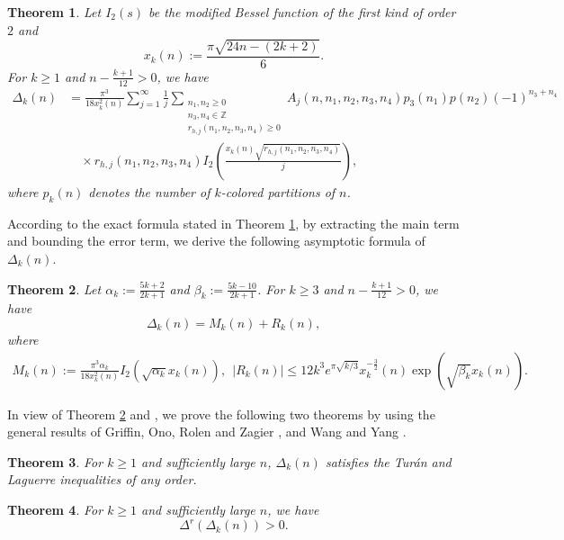 \documentclass[12pt]{article}
\newtheorem{thm}{Theorem}[section]
\numberwithin{equation}{section}
\begin{document}
\begin{thm}\label{exact}
Let $I_{2}(s)$ be the modified Bessel function of the first kind of order $2$ and \begin{equation}\label{defi-xk}
x_{k}(n):=\frac{\pi\sqrt{24n-(2k+2)}}{6}.
\end{equation}
For $k\geq 1$ and $n-\frac{k+1}{12}>0$, we have
\begin{align*}
\Delta_{k}(n)&=\frac{ \pi^3}{18 x^2_{k}(n)}\sum_{j=1}^{\infty} \frac{1}{j}
\sum_{\substack{n_1,n_2\geq 0 \\ n_3,n_4\in \mathbb{Z} \\r_{h,j}(n_1,n_2,n_3,n_4)\geq 0}}A_{j}(n,n_1,n_2,n_3,n_4)p_3(n_1)p(n_2)(-1)^{n_3+n_4}
\\
&\quad \times r_{h,j}(n_1,n_2,n_3,n_4) I_{2} \left( \frac{x_{k}(n)\sqrt{r_{h,j}(n_1,n_2,n_3,n_4)}}{j}  \right),
\end{align*}
where $p_k(n)$ denotes the number of $k$-colored partitions of $n$.
\end{thm}
According to the exact formula stated in Theorem \ref{exact}, by extracting the main term and bounding the error term, we derive the following asymptotic formula of $\Delta_{k}(n)$.

\begin{thm}\label{asympform}
Let $\alpha_k:=\frac{5k+2}{2k+1}$ and
$\beta_k:=\frac{5k-10}{2k+1}$.
For $k\geq 3$ and $n-\frac{k+1}{12}>0$, we have
\begin{equation*}
\Delta_{k}(n)=M_k(n) +R_{k}(n),
\end{equation*}
where
\begin{align}\label{eq:M-R}
M_k(n):=\frac{ \pi^3\alpha_k}{18 {x^2_{k}(n)}} I_2\left(\sqrt{\alpha_k } {x_{k}(n)}\right),
~~
|R_{k}(n)|\leq
12k^3 e^{\pi\sqrt{k/3}}x_{k}^{-\frac{3}{2}}(n)
\exp\left( \sqrt{\beta_k}x_{k}(n) \right).
\end{align}
\end{thm}
In view of Theorem \ref{asympform} and  \cite[Theorem 1.2]{Dong-Ji-Jia-2023}, we prove the following two theorems by using the general results of Griffin, Ono, Rolen and Zagier \cite{Griffin-Ono-Rolen-Zagier-2019}, and Wang and Yang \cite{Wang-Yang-2024}.
\begin{thm}\label{thm:ineq-any-order}
For $k\ge1$ and sufficiently large $n$, $\Delta_k(n)$ satisfies the Tur\'an and Laguerre inequalities of any order.
\end{thm}

\begin{thm}\label{thm:ineq-any-order-d}
For $k\ge1$ and sufficiently large $n$, we have
\begin{equation*}
\Delta^r \left(\Delta_k(n)\right)>0.
\end{equation*}
\end{thm}
\end{document}

